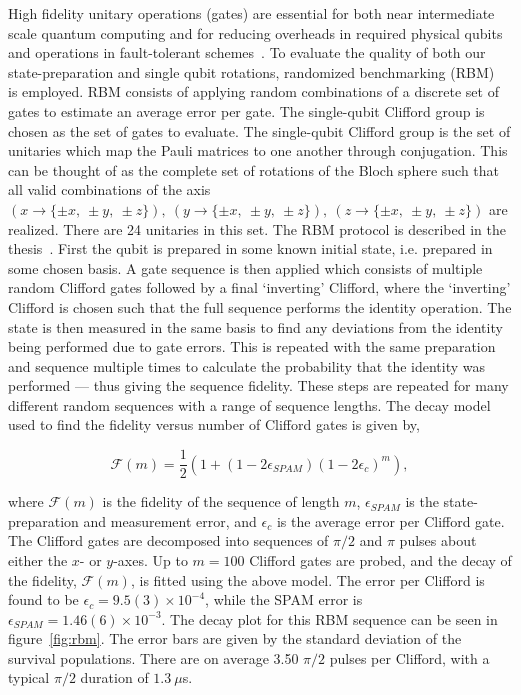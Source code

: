     High fidelity unitary operations (gates) are essential for both near
    intermediate scale quantum computing and for reducing overheads in required
    physical qubits and operations in fault-tolerant
    schemes~\cite{steane_overhead_2003}. To evaluate the quality of both our
    state-preparation and single qubit rotations, randomized benchmarking
    (RBM)~\cite{knill_randomized_2008, magesan_scalable_2011} is employed.  RBM consists of
    applying random combinations of a discrete set of gates to
    estimate an average error per gate.  The single-qubit Clifford
    group is chosen as the set of gates to evaluate. The single-qubit Clifford group is
    the set of unitaries which map the Pauli matrices to one another through
    conjugation. This can be thought of as the complete set of rotations of the
    Bloch sphere such that all valid combinations of the axis $(x \rightarrow
    \{\pm x,~\pm y,~\pm z\}),~(y \rightarrow \{\pm x,~\pm y,~\pm z\}),~(z
    \rightarrow \{\pm x,~\pm y,~\pm z\})$ are realized. There are 24 unitaries
    in this set. The RBM protocol is described in the
    thesis~\cite{hughes_benchmarking_2021}.
    First the qubit is prepared in some known initial state, i.e. prepared in
    some chosen basis. A gate sequence is then applied which consists of
    multiple random Clifford gates followed by a final `inverting' Clifford,
    where the `inverting' Clifford is chosen such that the full sequence
    performs the identity operation. The state is then measured in the same
    basis to find any deviations from the identity being performed due to gate
    errors. This is repeated with the same preparation and sequence multiple
    times to calculate the probability that the identity was performed --- thus
    giving the sequence fidelity. These steps are repeated for many different
    random sequences with a range of sequence lengths. The decay model used to find 
    the fidelity versus number of Clifford gates is given by\cite{hughes_benchmarking_2021},

    \begin{equation}
    \label{eq:RBM_decay}
        \mathcal{F}(m) = \frac{1}{2}\left( 1+(1-2\epsilon_{SPAM})(1-2\epsilon_c)^m\right),
    \end{equation}

    \noindent where $\mathcal{F}(m)$ is the fidelity of the sequence of length $m$,
    $\epsilon_{SPAM}$ is the state-preparation and measurement error, and
    $\epsilon_c$ is the average error per Clifford gate.  The Clifford gates are decomposed into
    sequences of $\pi/2$ and $\pi$ pulses about either the $x$- or $y$-axes. Up to $m=100$ Clifford gates are probed, and the decay of the fidelity, $\mathcal{F}(m)$, is fitted using the above model.
    The error per Clifford is found to be $\epsilon_c = 9.5(3) \times 10^{-4}$,
    while the SPAM error is $\epsilon_{SPAM} = 1.46(6) \times 10^{-3}$. The decay plot for
    this RBM sequence can be seen in figure~\ref{fig:rbm}. The error bars
    are given by the standard deviation of the survival populations. There are on average 3.50 $\pi/2$ pulses per Clifford, with a typical $\pi/2$ duration of $1.3~\mu$s.\\


